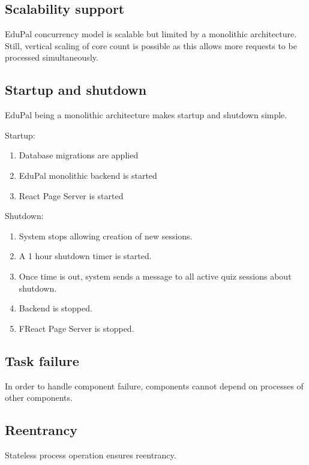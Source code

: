 \subsection{Scalability support}

EduPal concurrency model is scalable but limited by a monolithic architecture. Still, vertical scaling of core count is possible as this allows more requests to be processed simultaneously.

\subsection{Startup and shutdown}

EduPal being a monolithic architecture makes startup and shutdown simple.

Startup:

\begin{enumerate}
  \item Database migrations are applied
  \item EduPal monolithic backend is started
  \item React Page Server is started
\end{enumerate}

Shutdown:

\begin{enumerate}
  \item System stops allowing creation of new sessions.
  \item A 1 hour shutdown timer is started.
  \item Once time is out, system sends a message to all active quiz sessions about shutdown.
  \item Backend is stopped.
  \item FReact Page Server is stopped.
\end{enumerate}

\subsection{Task failure}

In order to handle component failure, components cannot depend on processes of other components.

\subsection{Reentrancy}

Stateless process operation ensures reentrancy.
